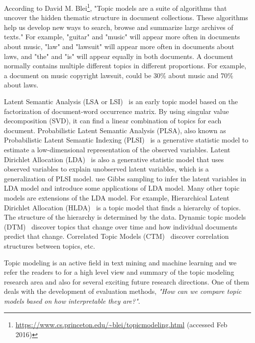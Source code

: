 According to David M. Blei\footnote{\url{https://www.cs.princeton.edu/~blei/topicmodeling.html} (accessed Feb 2016)}, "Topic models are a suite of algorithms that uncover the hidden thematic structure in document collections. These algorithms help us develop new ways to search, browse and summarize large archives of texts." For example, "guitar" and "music" will appear more often in documents about music, "law" and "lawsuit" will appear more often in documents about laws, and "the" and "is" will appear equally in both documents. A document normally contains multiple different topics in different proportions. For example, a document on music copyright lawsuit, could be 30\% about music and 70\% about laws.

Latent Semantic Analysis (LSA or LSI)~\cite{chp2deerwester1990indexing} \cite{chp2landauer1997solution} is an early topic model based on the factorization of document-word occurrence matrix. By using singular value decomposition (SVD), it can find a linear combination of topics for each document.
Probabilistic Latent Semantic Analysis (PLSA), also known as Probabilistic Latent Semantic Indexing (PLSI)~\cite{chp2papadimitriou1998latent}\cite{chp2hofmann1999probabilistic} is a generative statistic model to estimate a low-dimensional representation of the observed variables. Latent Dirichlet Allocation (LDA)~\cite{blei2003latent} is also a generative statistic model that uses observed variables to explain unobserved latent variables, which is a generalization of PLSI model. \cite{griffiths2004finding} \cite{chp2griffiths2002probabilistic} use Gibbs sampling to infer the latent variables in LDA model and introduce some applications of LDA model. Many other topic models are extensions of the LDA model. For example, Hierarchical Latent Dirichlet Allocation (HLDA)~\cite{chp2DBLP:conf/nips/2003} is a topic model that finds a hierarchy of topics. The structure of the hierarchy is determined by the data. Dynamic topic models (DTM)~\cite{chp2blei2006dynamic} discover topics that change over time and how individual documents predict that change. Correlated Topic Models (CTM)~\cite{chp2blei2006correlated} discover correlation structures between topics, etc.

Topic modeling is an active field in text mining and machine learning and we refer the readers to \cite{chp2Blei:2012:PTM:2133806.2133826} for a high level view and summary of the topic modeling research area and also for several exciting future research directions. One of them deals with the development of evaluation methods,
\textit{"How can we compare topic models based on how interpretable they are?"}.

